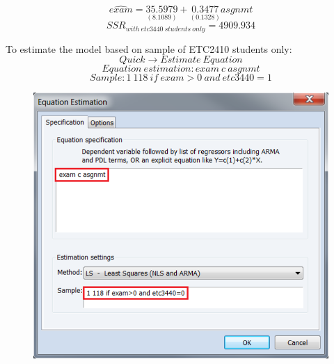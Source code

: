 \documentclass[12pt]{report}
\begin{document}
\vspace{-\baselineskip}
$$\widehat{exam} = \underset{(8.1089)}{35.5979} + \underset{(0.1328)}{0.3477}asgnmt$$
$$SSR_{with\ etc3440\ students\ only} = 4909.934$$

\noindent To estimate the model  based on sample of ETC2410 students only:
$$Quick \to Estimate\ Equation$$
$$Equation\ estimation: exam\ c\ asgnmt$$
$$Sample: 1\ 118\ if\ exam>0\ and\ etc3440=1$$

\begin{figure}[H]
	\centering
	\includegraphics{q1_29}
\end{figure}
\vspace{-\baselineskip}
\end{document}
